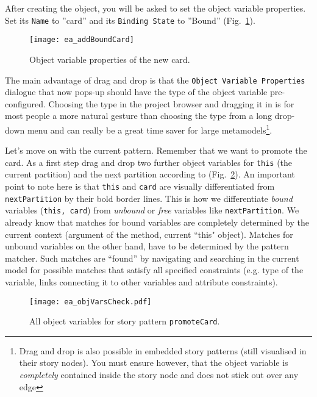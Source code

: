 After creating the object, you will be asked to set the object variable properties. Set its \texttt{Name} to ''card'' and its \texttt{Binding State} to
''Bound'' (Fig.~\ref{fig:sdm_new_card_properties}).

\begin{figure}[htbp]
\begin{center}
  \texttt{[image: ea\_addBoundCard]}
  \caption{Object variable properties of the new card.}
  \label{fig:sdm_new_card_properties}
\end{center}
\end{figure}

The main advantage of drag and drop is that the \texttt{Object Variable Pro\-per\-ties} dialogue that now pops-up should have the type of the object variable
pre-configured. Choosing the type in the project browser and dragging it in is for most people a more natural gesture than choosing the type from a long
drop-down menu and can really be a great time saver for large metamodels\footnote{Drag and drop is also possible in embedded story patterns (still visualised in
their story nodes).  You must ensure however, that the object variable is \emph{completely} contained inside the story node and does not stick out over any
edge}.

Let's move on with the current pattern. Remember that we want to promote the card. As a first step drag and drop two further object variables for \texttt{this}
(the current partition) and the next partition according to (Fig.~\ref{fig:sdm_check_complete_sp}). An important point to note here is that \texttt{this} and
\texttt{card} are visually differentiated from \texttt{nextPartition} by their bold border lines.
This is how we differentiate \emph{bound}  variables (\texttt{this, card}) from \emph{unbound} or \emph{free} variables like
\texttt{nextPartition}. We already know that matches for bound variables are completely determined by the current context (argument of the method, current
``this" object).
Matches for unbound variables on the other hand, have to be determined by the pattern matcher. Such matches are ``found'' by navigating and searching in the
current model for possible matches that satisfy all specified constraints (e.g. type of the variable, links connecting it to other variables and attribute
constraints).

\begin{figure}[htbp]
\begin{center}
  \texttt{[image: ea\_objVarsCheck.pdf]}
  \caption{All object variables for story pattern \texttt{promoteCard}.}
  \label{fig:sdm_check_complete_sp}
\end{center}
\end{figure}

